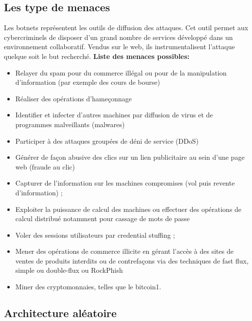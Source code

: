 \subsection{Les type de menaces}
Les botnets représentent les outils de diffusion des attaques.
Cet outil permet aux cybercriminels de disposer d'un grand nombre de services développé dans un environnement collaboratif. Vendus sur le web, ils instrumentalisent l'attaque quelque soit le but recherché.
\newline \textbf{Liste des menaces possibles:}
\begin{itemize}
	\item Relayer du spam pour du commerce illégal ou pour de la manipulation d'information (par exemple des cours de bourse) 
  \item Réaliser des opérations d'hameçonnage 
  \item Identifier et infecter d’autres machines par diffusion de virus et de programmes malveillants (malwares) 
  \item Participer à des attaques groupées de déni de service (DDoS)
  \item Générer de façon abusive des clics sur un lien publicitaire au sein d’une page web (fraude au clic) 
  \item Capturer de l’information sur les machines compromises (vol puis revente d'information) ;
  \item Exploiter la puissance de calcul des machines ou effectuer des opérations de calcul distribué notamment pour cassage de mots de passe 
  \item Voler des sessions utilisateurs par credential stuffing ;
  \item Mener des opérations de commerce illicite en gérant l'accès à des sites de ventes de produits interdits ou de contrefaçons via des techniques de fast flux, simple ou double-flux ou RockPhish 
  \item Miner des cryptomonnaies, telles que le bitcoin1.
\end{itemize}


\newpage\subsection{Architecture aléatoire}



